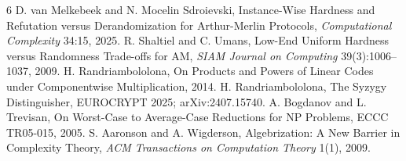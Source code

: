\documentclass[11pt]{article}
\begin{document}
\begin{thebibliography}{6}
 D. van Melkebeek and N. Mocelin Sdroievski, Instance-Wise Hardness and Refutation versus Derandomization for Arthur-Merlin Protocols, \emph{Computational Complexity} 34:15, 2025.
 R. Shaltiel and C. Umans, Low-End Uniform Hardness versus Randomness Trade-offs for AM, \emph{SIAM Journal on Computing} 39(3):1006--1037, 2009.
 H. Randriambololona, On Products and Powers of Linear Codes under Componentwise Multiplication, 2014.
 H. Randriambololona, The Syzygy Distinguisher, EUROCRYPT 2025; arXiv:2407.15740.
 A. Bogdanov and L. Trevisan, On Worst-Case to Average-Case Reductions for NP Problems, ECCC TR05-015, 2005.
 S. Aaronson and A. Wigderson, Algebrization: A New Barrier in Complexity Theory, \emph{ACM Transactions on Computation Theory} 1(1), 2009.
\end{thebibliography}
\end{document}
